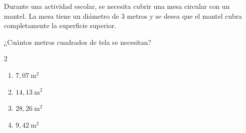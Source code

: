 Durante una actividad escolar, se necesita cubrir una mesa circular con un mantel. La mesa tiene un diámetro de 3 metros y se desea que el mantel cubra completamente la superficie superior.

¿Cuántos metros cuadrados de tela se necesitan?

\begin{multicols}{2}
\begin{enumerate}[label=\alph*), leftmargin=*]
\item $7{,}07\ \text{m}^2$
\item $14{,}13\ \text{m}^2$
\item $28{,}26\ \text{m}^2$
\item $9{,}42\ \text{m}^2$
\end{enumerate}
\end{multicols}
